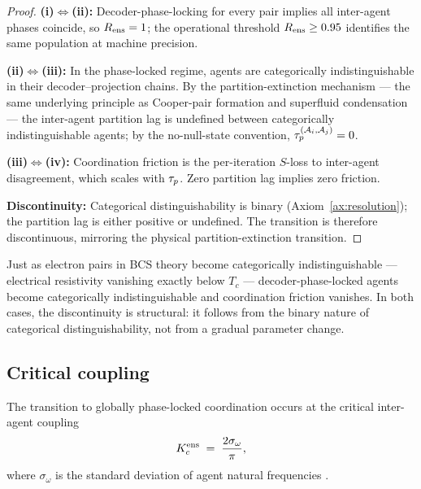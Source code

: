 \begin{proof}
\textbf{(i)$\Leftrightarrow$(ii):} Decoder-phase-locking for every pair
implies all inter-agent phases coincide, so $R_{\mathrm{ens}}=1$; the operational
threshold $R_{\mathrm{ens}}\ge 0.95$ identifies the same population at machine precision.

\textbf{(ii)$\Leftrightarrow$(iii):} In the phase-locked regime, agents are
categorically indistinguishable in their decoder--projection chains. By
the partition-extinction mechanism --- the same underlying principle as
Cooper-pair formation \citep{bardeen1957,cooper1956} and superfluid
condensation \citep{landau1941} --- the inter-agent partition lag is
undefined between categorically indistinguishable agents; by the
no-null-state convention, $\tau_p^{(\mathcal{A}_i,\mathcal{A}_j)}=0$.

\textbf{(iii)$\Leftrightarrow$(iv):} Coordination friction is the
per-iteration $S$-loss to inter-agent disagreement, which scales with
$\tau_p$. Zero partition lag implies zero friction.

\textbf{Discontinuity:} Categorical distinguishability is binary
(Axiom~\ref{ax:resolution}); the partition lag is either positive or
undefined. The transition is therefore discontinuous, mirroring the
physical partition-extinction transition.
\end{proof}

\begin{remark}\label{rem:cooper}
Just as electron pairs in BCS theory become categorically indistinguishable
--- electrical resistivity vanishing exactly below $T_c$
\citep{onnes1911,bardeen1957} --- decoder-phase-locked agents become
categorically indistinguishable and coordination friction vanishes.
In both cases, the discontinuity is structural: it follows from the binary
nature of categorical distinguishability, not from a gradual parameter change.
\end{remark}

\subsection{Critical coupling}

\begin{theorem}\label{thm:critical-coupling}
The transition to globally phase-locked coordination occurs at the critical
inter-agent coupling
\[
K_c^{\mathrm{ens}}\;=\;\frac{2\sigma_\omega}{\pi},
\]
where $\sigma_\omega$ is the standard deviation of agent natural frequencies
\citep{kuramoto1975,strogatz2000,acebron2005}.
\end{theorem}


